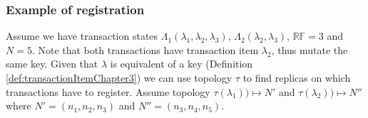 \documentclass[runningheads,a4paper]{llncs}
\newcommand{\topology}{$\tau$\xspace}
\newcommand{\topologyItem}[2]{$\tau(\text{\txItemi{#1}})) \mapsto \mathit{#2}$}
\newcommand{\paxosRoundIdi}[1]{$\iota_{#1}$\xspace}
\newcommand{\txItem}{$\lambda$\xspace}
\newcommand{\txItemi}[1]{$\lambda_{#1}$\xspace}
\newcommand{\txStatei}[1]{$\Lambda_{#1}$\xspace}
\newcommand{\txIndex}{$\chi$\xspace}
\newcommand{\paxos}{\emph{Paxos}\xspace}
\newcommand{\RF}[1]{\emph{$\mathbb{RF}=#1$}\xspace}
\begin{document}



\subsubsection{Example of registration}

Assume we have transaction states 
\txStatei{1}$(\text{\txItemi{1}},\text{\txItemi{2}}, \text{\txItemi{3}})$,
\txStatei{2}$(\text{\txItemi{2}},\text{\txItemi{3}})$, \RF{3} and $N=5$. 
Note that both transactions have transaction item \txItemi{2}, thus mutate the same key. Given that \txItem is equivalent of a key (Definition \ref{def:transactionItemChapter3}) we can use topology \topology to find replicas on which transactions have to register. Assume topology \topologyItem{1}{N'} and \topologyItem{2}{N''} where $N'=(n_1, n_2, n_3)$ and $N''=(n_3,n_4,n_5)$.
\end{document}
